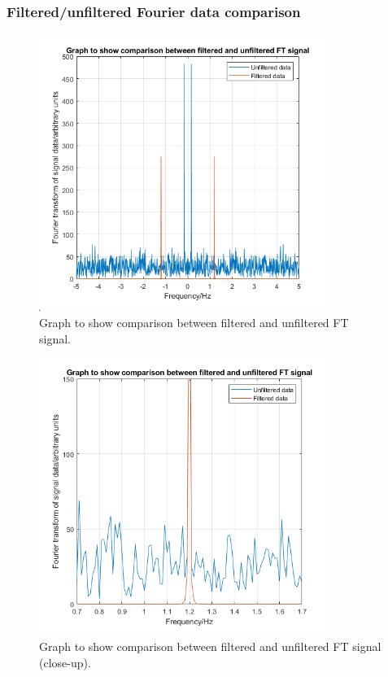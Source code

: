 \documentclass[11pt]{article}
\numberwithin{equation}{section}
\begin{document}
\subsubsection{Filtered/unfiltered Fourier data comparison}

\begin{figure}[H]
    \centering
    \includegraphics[height = 9cm]{./img/q304b.png}
    \caption{Graph to show comparison between filtered and unfiltered FT signal.}
    \label{fig:q304b}
\end{figure}
\begin{figure}[H]
    \centering
    \includegraphics[height = 9cm]{./img/q304b2.png}
    \caption{Graph to show comparison between filtered and unfiltered FT signal (close-up).}
    \label{fig:q304b2}
\end{figure}
\end{document}
